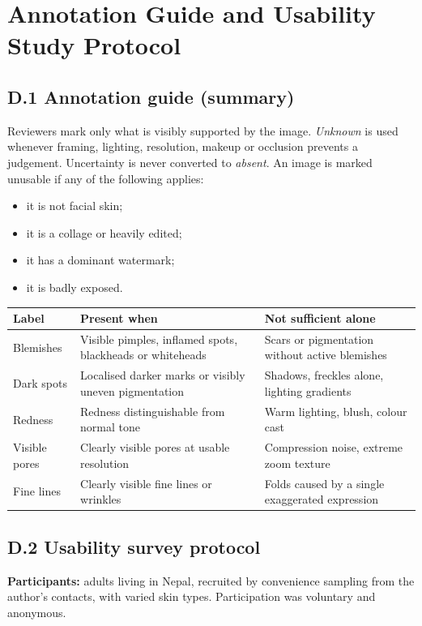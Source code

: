 \section{Annotation Guide and Usability Study Protocol}
\label{app:annotation}
\label{app:usability}

\subsection*{D.1 Annotation guide (summary)}

Reviewers mark only what is visibly supported by the image. \emph{Unknown} is used whenever framing, lighting, resolution, makeup or occlusion prevents a judgement. Uncertainty is never converted to \emph{absent}. An image is marked unusable if any of the following applies:
\begin{itemize}
  \item it is not facial skin;
  \item it is a collage or heavily edited;
  \item it has a dominant watermark;
  \item it is badly exposed.
\end{itemize}

\begin{tabularx}{\linewidth}{lYY}
\toprule
\textbf{Label} & \textbf{Present when} & \textbf{Not sufficient alone}\\
\midrule
Blemishes & Visible pimples, inflamed spots, blackheads or whiteheads & Scars or pigmentation without active blemishes\\
Dark spots & Localised darker marks or visibly uneven pigmentation & Shadows, freckles alone, lighting gradients\\
Redness & Redness distinguishable from normal tone & Warm lighting, blush, colour cast\\
Visible pores & Clearly visible pores at usable resolution & Compression noise, extreme zoom texture\\
Fine lines & Clearly visible fine lines or wrinkles & Folds caused by a single exaggerated expression\\
\bottomrule
\end{tabularx}

\subsection*{D.2 Usability survey protocol}

\textbf{Participants:} adults living in Nepal, recruited by convenience sampling from the author's contacts, with varied skin types. Participation was voluntary and anonymous.


